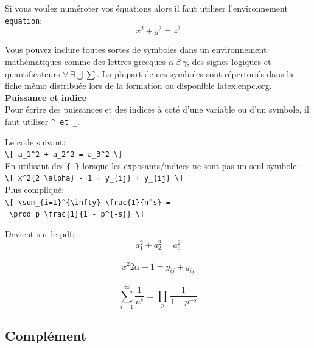 \documentclass[11pt]{article}				%
\begin{document}
Si vous voulez numéroter vos équations alors il faut utiliser l'environnement \texttt{equation}:
\begin{equation}
x^2 +y^2 = z^2
\end{equation}

Vous pouvez inclure toutes sortes de symboles dans un environnement mathématiques comme des lettres grecques $\alpha \ \beta \ \gamma$, des signes logiques et quantificateurs $\forall \ \exists \bigcup \sum$. La plupart de ces symboles sont répertoriés dans la fiche mémo distribuée lors de la formation ou disponible latex.enpc.org.\\

\textbf{Puissance et indice}\\

Pour écrire des puissances et des indices à coté d'une variable ou d'un symbole, il faut utiliser \verb|^ et _|.

\begin{multicols}{2}
Le code suivant:\\

\verb|\[ a_1^2 + a_2^2 = a_3^2 \]| \\

En utilisant des \texttt{\{ \}} lorsque les exposants/indices ne sont pas un seul symbole:\\

\verb|\[ x^2{2 \alpha} - 1 = y_{ij} + y_{ij} \]|\\

Plus compliqué:\\

\verb|\[ \sum_{i=1}^{\infty} \frac{1}{n^s} =| \\
\verb| \prod_p \frac{1}{1 - p^{-s}} \] |

\columnbreak

Devient sur le pdf:\\

$$ a_1^2 + a_2^2 = a_3^2$$\\
$$ x^2{2 \alpha} - 1 = y_{ij} + y_{ij} $$\\
\[ \sum_{i=1}^{\infty} \frac{1}{n^s} = \prod_p \frac{1}{1 - p^{-s}} \]

\end{multicols}



\newpage



\subsection{Complément}
\end{document}
